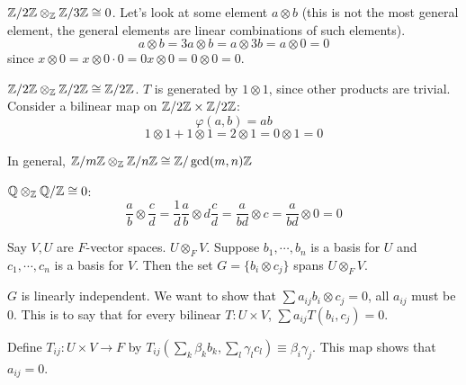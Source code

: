 \documentclass[a4paper,twoside,master.tex]{subfiles}
\begin{document}
\begin{ex}
    $ \mathbb{Z}/2\mathbb{Z} \otimes_{\mathbb{Z}} \mathbb{Z}/3\mathbb{Z} \cong 0 $. Let's look at some element $ a\otimes b $ (this is not the most general element, the general elements are linear combinations of such elements).
    \begin{equation}
        a\otimes b = 3a\otimes b = a \otimes 3b = a \otimes 0 = 0
    \end{equation}
    since $ x \otimes 0 = x\otimes 0 \cdot 0 = 0x \otimes 0 = 0 \otimes 0 = 0 $. 
\end{ex}
\begin{ex}
    $ \mathbb{Z}/2\mathbb{Z} \otimes_{\mathbb{Z}} \mathbb{Z}/2\mathbb{Z} \cong \mathbb{Z}/2\mathbb{Z} $. $ T $ is generated by $ 1\otimes 1 $, since other products are trivial. Consider a bilinear map on $ \mathbb{Z}/2\mathbb{Z} \times \mathbb{Z}/2\mathbb{Z} $:
    \begin{equation}
        \varphi(a,b) = ab
    \end{equation}
    \begin{equation}
        1 \otimes 1 + 1 \otimes 1 = 2 \otimes 1 = 0 \otimes 1 = 0
    \end{equation}
\end{ex}
\begin{ex}
    In general, $ \mathbb{Z}/m\mathbb{Z} \otimes_{\mathbb{Z}} \mathbb{Z}/n\mathbb{Z} \cong \mathbb{Z}/ \gcd(m ,n) \mathbb{Z} $
\end{ex}
\begin{ex}
    $ \mathbb{Q} \otimes_{\mathbb{Z}} \mathbb{Q}/\mathbb{Z} \cong 0 $:
    \begin{equation}
        \frac{a}{b} \otimes \frac{c}{d} = \frac{1}{d} \frac{a}{b} \otimes d \frac{c}{d} = \frac{a}{bd} \otimes c = \frac{a}{bd} \otimes 0 = 0
    \end{equation}
\end{ex}
\begin{ex}
    Say $ V,U $ are $ F $-vector spaces. $ U \otimes_F V $. Suppose $ b_1, \cdots, b_n $ is a basis for $ U $ and $ c_1, \cdots, c_n $ is a basis for $ V $. Then the set $ G = \{b_i \otimes c_j\} $ spans $ U \otimes_F V $.
    
    $ G $ is linearly independent. We want to show that $ \sum a_{ij} b_i \otimes c_j = 0 $, all $ a_{ij} $ must be $ 0 $. This is to say that for every bilinear $ T\colon U \times V $, $ \sum a_{ij} T(b_i, c_j) = 0 $.

    Define $ T_{ij} \colon U \times V \to F $ by $ T_{ij}(\sum_k \beta_k b_k, \sum_l \gamma_l c_l) \equiv \beta_i \gamma_j $. This map shows that $ a_{ij} = 0 $. 
\end{ex}
\end{document}
